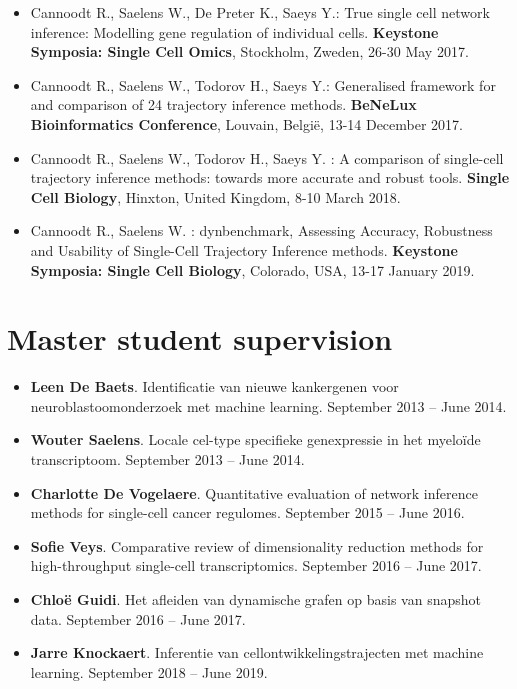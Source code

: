\begin{itemize}
  \item Cannoodt R., Saelens W., De Preter K., Saeys Y.: True single cell network inference: Modelling gene regulation of individual cells. \textbf{Keystone Symposia: Single Cell Omics}, Stockholm, Zweden, 26-30 May 2017. 
  \item Cannoodt R., Saelens W., Todorov H., Saeys Y.: Generalised framework for and comparison of 24 trajectory inference methods. \textbf{BeNeLux Bioinformatics Conference}, Louvain, België, 13-14 December 2017.
  \item Cannoodt R., Saelens W., Todorov H., Saeys Y. : A comparison of single-cell trajectory inference methods: towards more accurate and robust tools. \textbf{Single Cell Biology}, Hinxton, United Kingdom, 8-10 March 2018.
  \item Cannoodt R., Saelens W. : dynbenchmark, Assessing Accuracy, Robustness and Usability of Single-Cell Trajectory Inference methods. \textbf{Keystone Symposia: Single Cell Biology}, Colorado, USA, 13-17 January 2019.
\end{itemize}

\section{Master student supervision}

\begin{itemize}
  \item \textbf{Leen De Baets}. Identificatie van nieuwe kankergenen voor neuroblastoomonderzoek met machine learning. September 2013 -- June 2014.
  \item \textbf{Wouter Saelens}. Locale cel-type specifieke genexpressie in het myeloïde transcriptoom. September 2013 -- June 2014.
  \item \textbf{Charlotte De Vogelaere}. Quantitative evaluation of network inference methods for single-cell cancer regulomes. September 2015 -- June 2016.
  \item \textbf{Sofie Veys}. Comparative review of dimensionality reduction methods for high-throughput single-cell transcriptomics. September 2016 -- June 2017.
  \item \textbf{Chloë Guidi}. Het afleiden van dynamische grafen op basis van snapshot data. September 2016 -- June 2017.
  \item \textbf{Jarre Knockaert}. Inferentie van cellontwikkelingstrajecten met machine learning. September 2018 -- June 2019.
\end{itemize}


